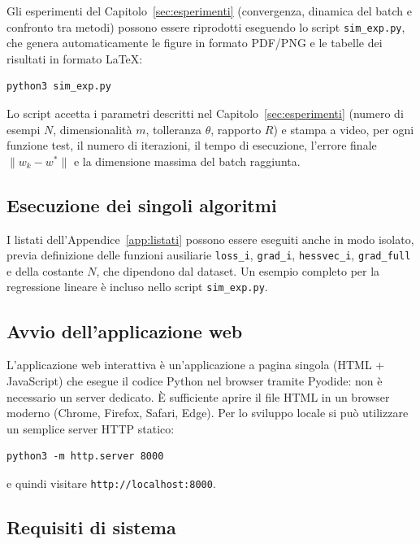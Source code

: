 \documentclass[a4paper,12pt]{article}
\numberwithin{equation}{section}
\numberwithin{figure}{section}
\numberwithin{table}{section}
\begin{document}
Gli esperimenti del Capitolo~\ref{sec:esperimenti} (convergenza, dinamica del
batch e confronto tra metodi) possono essere riprodotti eseguendo lo script
\texttt{sim\_exp.py}, che genera automaticamente le figure in formato PDF/PNG e
le tabelle dei risultati in formato LaTeX:

\begin{verbatim}
python3 sim_exp.py
\end{verbatim}

Lo script accetta i parametri descritti nel Capitolo~\ref{sec:esperimenti}
(numero di esempi $N$, dimensionalità $m$, tolleranza $\theta$, rapporto
$R$) e stampa a video, per ogni funzione test, il numero di iterazioni, il
tempo di esecuzione, l'errore finale $\|w_k - w^*\|$ e la dimensione massima
del batch raggiunta.

\subsection{Esecuzione dei singoli algoritmi}

I listati dell'Appendice~\ref{app:listati} possono essere eseguiti anche in
modo isolato, previa definizione delle funzioni ausiliarie
\texttt{loss\_i}, \texttt{grad\_i}, \texttt{hessvec\_i}, \texttt{grad\_full}
e della costante $N$, che dipendono dal dataset. Un esempio completo per la
regressione lineare è incluso nello script \texttt{sim\_exp.py}.

\subsection{Avvio dell'applicazione web}

L'applicazione web interattiva è un'applicazione a pagina singola (HTML +
JavaScript) che esegue il codice Python nel browser tramite Pyodide: non è
necessario un server dedicato. È sufficiente aprire il file HTML in un
browser moderno (Chrome, Firefox, Safari, Edge). Per lo sviluppo locale si può
utilizzare un semplice server HTTP statico:

\begin{verbatim}
python3 -m http.server 8000
\end{verbatim}

e quindi visitare \texttt{http://localhost:8000}.

\subsection{Requisiti di sistema}
\end{document}
